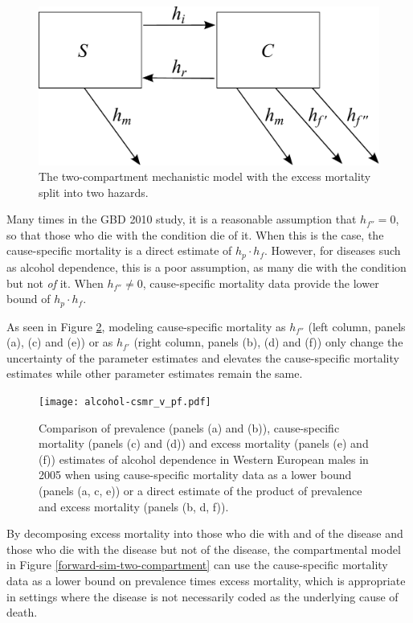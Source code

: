     \begin{figure}[h]
        \begin{center}
            \includegraphics[width=\textwidth]{SC2.pdf}
            \caption{The two-compartment mechanistic model with the
              excess mortality split into two hazards.}
            \label{fig:two_compartment_2f}
        \end{center}
    \end{figure}

Many times in the GBD 2010 study, it is a reasonable assumption that
$h_{f''} = 0$, so that those who die with the condition die of it.
When this is the case, the cause-specific mortality is a direct
estimate of $h_{p} \cdot h_{f}$.  However, for diseases such as alcohol
dependence, this is a poor assumption, as many die with the condition
but not \emph{of} it.  When $h_{f''} \neq 0$, cause-specific mortality
data provide the lower bound of $h_{p} \cdot h_{f}$.

As seen in Figure \ref{fig:app-alcohol compare}, modeling cause-specific mortality as
$h_{f''}$ (left column, panels (a), (c) and (e)) or as $h_{f'}$ (right
column, panels (b), (d) and (f)) only change the uncertainty of the
parameter estimates and elevates the cause-specific mortality
estimates while other parameter estimates remain the same.

    \begin{figure}[h]
        \begin{center}
            \texttt{[image: alcohol-csmr\_v\_pf.pdf]}
            \caption{Comparison of prevalence (panels (a) and (b)),
              cause-specific mortality (panels (c) and (d)) and excess
              mortality (panels (e) and (f)) estimates of alcohol
              dependence in Western European males in 2005 when using
              cause-specific mortality data as a lower bound (panels
              (a, c, e)) or a direct estimate of the product of
              prevalence and excess mortality (panels (b, d, f)).}
            \label{fig:app-alcohol compare}
        \end{center}
    \end{figure}

By decomposing excess mortality into those who die with and of the
disease and those who die with the disease but not of the disease, the
compartmental model in Figure \ref{forward-sim-two-compartment} can
use the cause-specific mortality data as a lower bound on prevalence
times excess mortality, which is appropriate in settings where the
disease is not necessarily coded as the underlying cause of death.

